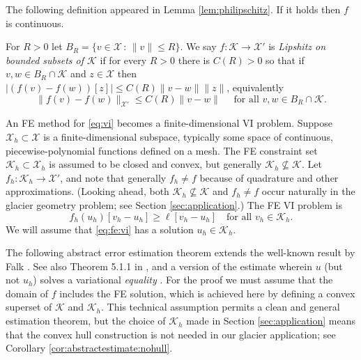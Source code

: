 \documentclass[hidelinks,onefignum,onetabnum,final]{siamart220329}  %
\newcommand{\cK}{\mathcal{K}}
\newcommand{\cX}{\mathcal{X}}
\begin{document}
The following definition appeared in Lemma \ref{lem:philipschitz}.  If it holds then $f$ is continuous.

\begin{definition} \label{def:lipshitz}
For $R>0$ let $B_R = \{v\in \cX\,:\,\|v\|\le R\}$.  We say $f:\cK \to \cX'$ is \emph{Lipshitz on bounded subsets of $\cK$} if for every $R>0$ there is $C(R)>0$ so that if $v,w \in B_R \cap \cK$ and $z\in\cX$ then $|\left(f(v)-f(w)\right)[z]| \le C(R) \|v-w\| \|z\|$, equivalently
\begin{equation}
\|f(v)-f(w)\|_{\cX'} \le C(R) \|v-w\| \quad \text{ for all } v,w \in B_R \cap \cK.  \label{eq:liponbounded}
\end{equation}
\end{definition}

An FE method for \eqref{eq:vi} becomes a finite-dimensional VI problem.  Suppose $\cX_h \subset \cX$ is a finite-dimensional subspace, typically some space of continuous, piecewise-polynomial functions defined on a mesh.  The FE constraint set $\cK_h\subset \cX_h$ is assumed to be closed and convex, but generally $\cK_h \nsubseteq \cK$.  Let $f_h:\cK_h\to\cX'$, and note that generally $f_h\ne f$ because of quadrature and other approximations.  (Looking ahead, both $\cK_h \nsubseteq \cK$ and $f_h\ne f$ occur naturally in the glacier geometry problem; see Section \ref{sec:application}.)  The FE VI problem is
\begin{equation}
f_h(u_h)[v_h-u_h] \ge \ell[v_h-u_h] \quad \text{for all } v_h\in \cK_h. \label{eq:fe:vi}
\end{equation}
We will assume that \eqref{eq:fe:vi} has a solution $u_h\in\cK_h$.

The following abstract error estimation theorem extends the well-known result by Falk \cite{Falk1974}.  See also Theorem 5.1.1 in \cite{Ciarlet2002}, and a version of the estimate wherein $u$ (but not $u_h$) solves a variational \emph{equality} \cite[Theorem 1]{KirbyShapero2024}.  For the proof we must assume that the domain of $f$ includes the FE solution, which is achieved here by defining a convex superset of $\cK$ and $\cK_h$.  This technical assumption permits a clean and general estimation theorem, but the choice of $\cK_h$ made in Section \ref{sec:application} means that the convex hull construction is not needed in our glacier application; see Corollary \ref{cor:abstractestimate:nohull}.
\end{document}
